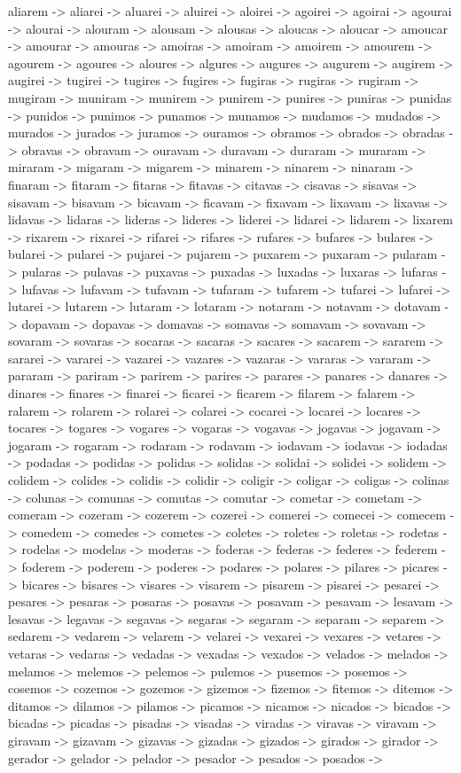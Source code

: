 \documentclass[a4paper,11pt]{article}
\begin{document}
aliarem -> aliarei -> aluarei -> aluirei -> aloirei -> agoirei -> agoirai -> agourai -> alourai -> alouram -> alousam -> alousas -> aloucas -> aloucar -> amoucar -> amourar -> amouras -> amoiras -> amoiram -> amoirem -> amourem -> agourem -> agoures -> aloures -> algures -> augures -> augurem -> augirem -> augirei -> tugirei -> tugires -> fugires -> fugiras -> rugiras -> rugiram -> mugiram -> muniram -> munirem -> punirem -> punires -> puniras -> punidas -> punidos -> punimos -> punamos -> munamos -> mudamos -> mudados -> murados -> jurados -> juramos -> ouramos -> obramos -> obrados -> obradas -> obravas -> obravam -> ouravam -> duravam -> duraram -> muraram -> miraram -> migaram -> migarem -> minarem -> ninarem -> ninaram -> finaram -> fitaram -> fitaras -> fitavas -> citavas -> cisavas -> sisavas -> sisavam -> bisavam -> bicavam -> ficavam -> fixavam -> lixavam -> lixavas -> lidavas -> lidaras -> lideras -> lideres -> liderei -> lidarei -> lidarem -> lixarem -> rixarem -> rixarei -> rifarei -> rifares -> rufares -> bufares -> bulares -> bularei -> pularei -> pujarei -> pujarem -> puxarem -> puxaram -> pularam -> pularas -> pulavas -> puxavas -> puxadas -> luxadas -> luxaras -> lufaras -> lufavas -> lufavam -> tufavam -> tufaram -> tufarem -> tufarei -> lufarei -> lutarei -> lutarem -> lutaram -> lotaram -> notaram -> notavam -> dotavam -> dopavam -> dopavas -> domavas -> somavas -> somavam -> sovavam -> sovaram -> sovaras -> socaras -> sacaras -> sacares -> sacarem -> sararem -> sararei -> vararei -> vazarei -> vazares -> vazaras -> vararas -> vararam -> pararam -> pariram -> parirem -> parires -> parares -> panares -> danares -> dinares -> finares -> finarei -> ficarei -> ficarem -> filarem -> falarem -> ralarem -> rolarem -> rolarei -> colarei -> cocarei -> locarei -> locares -> tocares -> togares -> vogares -> vogaras -> vogavas -> jogavas -> jogavam -> jogaram -> rogaram -> rodaram -> rodavam -> iodavam -> iodavas -> iodadas -> podadas -> podidas -> polidas -> solidas -> solidai -> solidei -> solidem -> colidem -> colides -> colidis -> colidir -> coligir -> coligar -> coligas -> colinas -> colunas -> comunas -> comutas -> comutar -> cometar -> cometam -> comeram -> cozeram -> cozerem -> cozerei -> comerei -> comecei -> comecem -> comedem -> comedes -> cometes -> coletes -> roletes -> roletas -> rodetas -> rodelas -> modelas -> moderas -> foderas -> federas -> federes -> federem -> foderem -> poderem -> poderes -> podares -> polares -> pilares -> picares -> bicares -> bisares -> visares -> visarem -> pisarem -> pisarei -> pesarei -> pesares -> pesaras -> posaras -> posavas -> posavam -> pesavam -> lesavam -> lesavas -> legavas -> segavas -> segaras -> segaram -> separam -> separem -> sedarem -> vedarem -> velarem -> velarei -> vexarei -> vexares -> vetares -> vetaras -> vedaras -> vedadas -> vexadas -> vexados -> velados -> melados -> melamos -> melemos -> pelemos -> pulemos -> pusemos -> posemos -> cosemos -> cozemos -> gozemos -> gizemos -> fizemos -> fitemos -> ditemos -> ditamos -> dilamos -> pilamos -> picamos -> nicamos -> nicados -> bicados -> bicadas -> picadas -> pisadas -> visadas -> viradas -> viravas -> viravam -> giravam -> gizavam -> gizavas -> gizadas -> gizados -> girados -> girador -> gerador -> gelador -> pelador -> pesador -> pesados -> posados -> 
\end{document}
